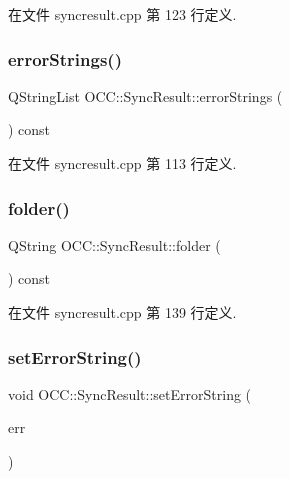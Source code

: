 在文件 syncresult.\+cpp 第 123 行定义.

\mbox{\label{class_o_c_c_1_1_sync_result_ab262a64e66abbbce8a9b267d593b9b01}} 
\subsubsection{\texorpdfstring{error\+Strings()}{errorStrings()}}
{\footnotesize\ttfamily Q\+String\+List O\+C\+C\+::\+Sync\+Result\+::error\+Strings (\begin{DoxyParamCaption}{ }\end{DoxyParamCaption}) const}



在文件 syncresult.\+cpp 第 113 行定义.

\mbox{\label{class_o_c_c_1_1_sync_result_afd387ea23641d6bf66aa711179a82d5b}} 
\subsubsection{\texorpdfstring{folder()}{folder()}}
{\footnotesize\ttfamily Q\+String O\+C\+C\+::\+Sync\+Result\+::folder (\begin{DoxyParamCaption}{ }\end{DoxyParamCaption}) const}



在文件 syncresult.\+cpp 第 139 行定义.

\mbox{\label{class_o_c_c_1_1_sync_result_afe0a86f4f4a4f96e396d379f244e5088}} 
\subsubsection{\texorpdfstring{set\+Error\+String()}{setErrorString()}}
{\footnotesize\ttfamily void O\+C\+C\+::\+Sync\+Result\+::set\+Error\+String (\begin{DoxyParamCaption}\item[{const Q\+String \&}]{err }\end{DoxyParamCaption})}



